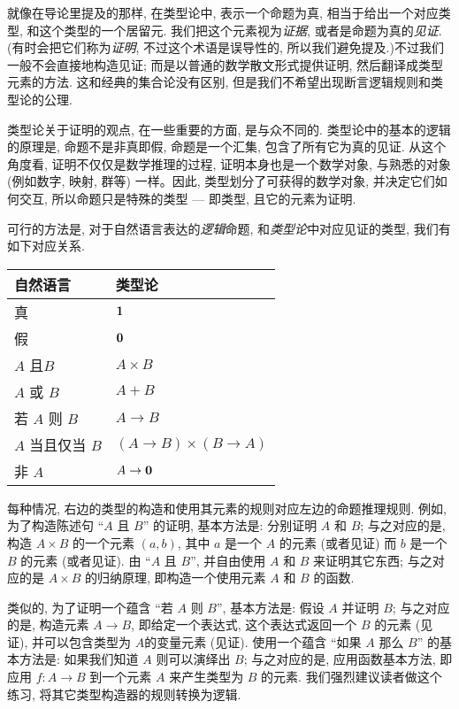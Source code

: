 %
%
就像在导论里提及的那样, 在类型论中, 表示一个命题为真, 相当于给出一个对应类型, 和这个类型的一个居留元. %
%
我们把这个元素视为\emph{证据}, 或者是命题为真的\emph{见证}. (有时会把它们称为\emph{证明}, 不过这个术语是误导性的, 所以我们避免提及.)不过我们一般不会直接地构造见证; 而是以普通的数学散文形式提供证明, 然后翻译成类型元素的方法. 这和经典的集合论没有区别, 但是我们不希望出现断言逻辑规则和类型论的公理. 

类型论关于证明的观点, 在一些重要的方面, 是与众不同的. 类型论中的基本的逻辑的原理是, 命题不是非真即假, 命题是一个汇集, 包含了所有它为真的见证. 从这个角度看, 证明不仅仅是数学推理的过程, 证明本身也是一个数学对象, 与熟悉的对象(例如数字, 映射, 群等) 一样。因此, 类型划分了可获得的数学对象, 并决定它们如何交互, 所以命题只是特殊的类型 --- 即类型, 且它的元素为证明. 

%
%
可行的方法是, 对于自然语言表达的\emph{逻辑}命题, 和\emph{类型论}中对应见证的类型, 我们有如下对应关系. %
%
%
%
%
\begin{center}
\medskip
\begin{tabular}{ll}
\toprule
自然语言 &类型论\\
\midrule
真 &$\mathbf{1}$ \\
假 &$\mathbf{0}$ \\
$A$ 且$B$ &$A \times B$ \\
$A$ 或 $B$ &$A + B$ \\
若 $A$ 则 $B$ &$A \to B$ \\
$A$ 当且仅当 $B$ &$(A \to B) \times (B \to A)$ \\
非 $A$ &$A \to \mathbf{0}$ \\
\bottomrule
\end{tabular}
\medskip
\end{center}

每种情况, 右边的类型的构造和使用其元素的规则对应左边的命题推理规则. 例如, 为了构造陈述句 ``$A$ 且 $B$'' 的证明, 基本方法是: 分别证明 $A$ 和 $B$; 与之对应的是, 构造 $A\times B$ 的一个元素 $(a,b)$, 其中 $a$ 是一个 $A$ 的元素 (或者见证) 而 $b$ 是一个 $B$ 的元素 (或者见证). 由 ``$A$ 且 $B$'', 并自由使用 $A$ 和 $B$ 来证明其它东西; 与之对应的是 $A\times B$ 的归纳原理, 即构造一个使用元素 $A$ 和 $B$ 的函数. 

类似的, 为了证明一个蕴含 ``若 $A$ 则 $B$'', 基本方法是: 假设 $A$ 并证明 $B$; 与之对应的是, 构造元素 $A\to B$, 即给定一个表达式, 这个表达式返回一个 $B$ 的元素 (见证), 并可以包含类型为 $A$的变量元素 (见证). 使用一个蕴含 ``如果 $A$ 那么 $B$'' 的基本方法是: 如果我们知道 $A$ 则可以演绎出 $B$; 与之对应的是, 应用函数基本方法, 即应用 $f:A\to B$ 到一个元素 $A$ 来产生类型为 $B$ 的元素. 我们强烈建议读者做这个练习, 将其它类型构造器的规则转换为逻辑. 

